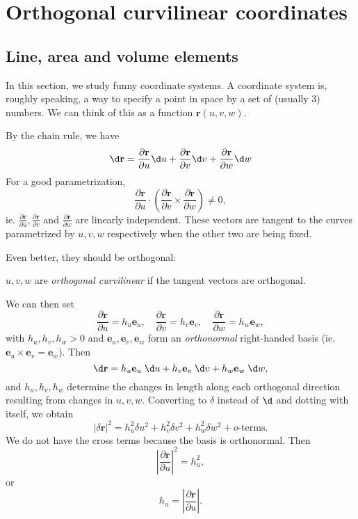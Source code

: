 \documentclass[a4paper]{article}
\begin{document}
\section{Orthogonal curvilinear coordinates}
\subsection{Line, area and volume elements}
In this section, we study funny coordinate systems. A coordinate system is, roughly speaking, a way to specify a point in space by a set of (usually 3) numbers. We can think of this as a function $\mathbf{r}(u, v, w)$.

By the chain rule, we have
\[
  \d \mathbf{r} = \frac{\partial \mathbf{r}}{\partial u}\d u + \frac{\partial \mathbf{r}}{\partial v}\d v + \frac{\partial \mathbf{r}}{\partial w}\d w
\]
For a good parametrization,
\[
  \frac{\partial \mathbf{r}}{\partial u}\cdot \left(\frac{\partial \mathbf{r}}{\partial v}\times \frac{\partial \mathbf{r}}{\partial w}\right) \not = 0,
\]
ie. $\frac{\partial \mathbf{r}}{\partial u}, \frac{\partial \mathbf{r}}{\partial v}$ and $\frac{\partial \mathbf{r}}{\partial w}$ are linearly independent. These vectors are tangent to the curves parametrized by $u, v, w$ respectively when the other two are being fixed.

Even better, they should be orthogonal:
\begin{defi}
  $u, v, w$ are \emph{orthogonal curvilinear} if the tangent vectors are orthogonal.
\end{defi}
We can then set
\[
  \frac{\partial \mathbf{r}}{\partial u} = h_u \mathbf{e}_u, \quad \frac{\partial \mathbf{r}}{\partial v} = h_v \mathbf{e}_v,\quad \frac{\partial \mathbf{r}}{\partial w} = h_w \mathbf{e}_w,
\]
with $h_u, h_v, h_w > 0$ and $\mathbf{e}_u, \mathbf{e}_v, \mathbf{e}_w$ form an \emph{orthonormal} right-handed basis (ie. $\mathbf{e}_u \times \mathbf{e}_v = \mathbf{e}_w$). Then
\[
  \d \mathbf{r} = h_u \mathbf{e}_u \;\d u + h_v \mathbf{e}_v\;\d v + h_w\mathbf{e}_w \;\d w,
\]
and $h_u, h_v, h_w$ determine the changes in length along each orthogonal direction resulting from changes in $u, v, w$. Converting to $\delta$ instead of $\d$ and dotting with itself, we obtain
\[
  |\delta \mathbf{r}|^2 = h_u^2 \delta u^2 + h_v^2 \delta v^2 + h_w^2 \delta w^2 + o\text{-terms}.
\]
We do not have the cross terms because the basis is orthonormal. Then
\[
  \left|\frac{\partial \mathbf{r}}{\partial u}\right|^2 = h_u^2,
\]
or
\[
  h_u = \left|\frac{\partial \mathbf{r}}{\partial u}\right|.
\]
\end{document}
